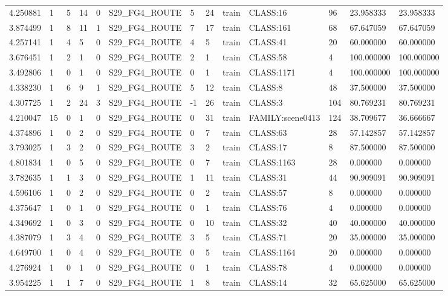 \begin{tabular}{lllllllllllll}
4.250881 & 1 & 5 & 14 & 0 & S29\_FG4\_ROUTE & 5 & 24 & train & CLASS:16 & 96 & 23.958333 & 23.958333 \\
3.874499 & 1 & 8 & 11 & 1 & S29\_FG4\_ROUTE & 7 & 17 & train & CLASS:161 & 68 & 67.647059 & 67.647059 \\
4.257141 & 1 & 4 & 5 & 0 & S29\_FG4\_ROUTE & 4 & 5 & train & CLASS:41 & 20 & 60.000000 & 60.000000 \\
3.676451 & 1 & 2 & 1 & 0 & S29\_FG4\_ROUTE & 2 & 1 & train & CLASS:58 & 4 & 100.000000 & 100.000000 \\
3.492806 & 1 & 0 & 1 & 0 & S29\_FG4\_ROUTE & 0 & 1 & train & CLASS:1171 & 4 & 100.000000 & 100.000000 \\
4.338230 & 1 & 6 & 9 & 1 & S29\_FG4\_ROUTE & 5 & 12 & train & CLASS:8 & 48 & 37.500000 & 37.500000 \\
4.307725 & 1 & 2 & 24 & 3 & S29\_FG4\_ROUTE & -1 & 26 & train & CLASS:3 & 104 & 80.769231 & 80.769231 \\
4.210047 & 15 & 0 & 1 & 0 & S29\_FG4\_ROUTE & 0 & 31 & train & FAMILY:scene0413 & 124 & 38.709677 & 36.666667 \\
4.374896 & 1 & 0 & 2 & 0 & S29\_FG4\_ROUTE & 0 & 7 & train & CLASS:63 & 28 & 57.142857 & 57.142857 \\
3.793025 & 1 & 3 & 2 & 0 & S29\_FG4\_ROUTE & 3 & 2 & train & CLASS:17 & 8 & 87.500000 & 87.500000 \\
4.801834 & 1 & 0 & 5 & 0 & S29\_FG4\_ROUTE & 0 & 7 & train & CLASS:1163 & 28 & 0.000000 & 0.000000 \\
3.782635 & 1 & 1 & 3 & 0 & S29\_FG4\_ROUTE & 1 & 11 & train & CLASS:31 & 44 & 90.909091 & 90.909091 \\
4.596106 & 1 & 0 & 2 & 0 & S29\_FG4\_ROUTE & 0 & 2 & train & CLASS:57 & 8 & 0.000000 & 0.000000 \\
4.375647 & 1 & 0 & 1 & 0 & S29\_FG4\_ROUTE & 0 & 1 & train & CLASS:76 & 4 & 0.000000 & 0.000000 \\
4.349692 & 1 & 0 & 3 & 0 & S29\_FG4\_ROUTE & 0 & 10 & train & CLASS:32 & 40 & 40.000000 & 40.000000 \\
4.387079 & 1 & 3 & 4 & 0 & S29\_FG4\_ROUTE & 3 & 5 & train & CLASS:71 & 20 & 35.000000 & 35.000000 \\
4.649700 & 1 & 0 & 4 & 0 & S29\_FG4\_ROUTE & 0 & 5 & train & CLASS:1164 & 20 & 0.000000 & 0.000000 \\
4.276924 & 1 & 0 & 1 & 0 & S29\_FG4\_ROUTE & 0 & 1 & train & CLASS:78 & 4 & 0.000000 & 0.000000 \\
3.954225 & 1 & 1 & 7 & 0 & S29\_FG4\_ROUTE & 1 & 8 & train & CLASS:14 & 32 & 65.625000 & 65.625000 \\

\end{tabular}
